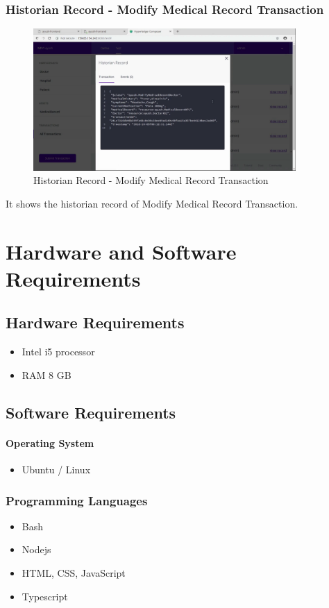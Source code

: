 \documentclass[11pt]{report}
\begin{document}
    
    \subsection{Historian Record - Modify Medical Record Transaction} 
    \begin{figure}[h!]
        \centering
        \includegraphics[scale=0.3,width=10cm]{Proto6.png}
        \caption{Historian Record - Modify Medical Record Transaction}
        \label{fig:my_label}
    \end{figure}
    It shows the historian record of Modify Medical Record Transaction.
    
\chapter{Hardware and Software Requirements}
        \section{Hardware Requirements}
                \begin{itemize}
                    \item Intel i5 processor
                    \item RAM 8 GB
                \end{itemize}
        \section{Software Requirements}  
                \subsubsection{Operating System}
                            \begin{itemize}
                                \item Ubuntu / Linux
                            \end{itemize} 
                \subsection{Programming Languages}
                            \begin{itemize}
                                \item Bash
                                \item Nodejs
                                \item HTML, CSS, JavaScript
                                \item Typescript
                            \end{itemize}
\end{document}
